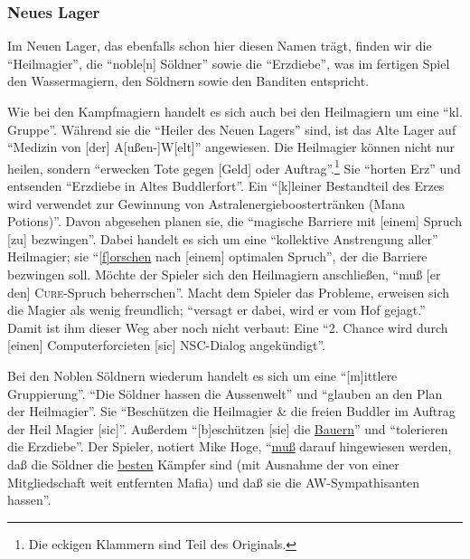 \documentclass[a5paper,pagesize,numbers=noenddot]{scrbook}
\begin{document}
\subsubsection{Neues Lager}\label{sec:orpheus_welt_fraktionen_neues}
Im Neuen Lager, das ebenfalls schon hier diesen Namen trägt, finden wir die \enquote{Heilmagier},\autocite[S.~7]{orpheus_gildensystem} die \enquote{noble[n] Söldner}\autocite[S.~8]{orpheus_gildensystem} sowie die \enquote{Erzdiebe},\autocite[S.~9]{orpheus_gildensystem} was im fertigen Spiel den Wassermagiern, den Söldnern sowie den Banditen entspricht.

Wie bei den Kampfmagiern handelt es sich auch bei den Heilmagiern um eine \enquote{kl. Gruppe}.
Während sie die \enquote{Heiler des Neuen Lagers} sind, ist das Alte Lager auf \enquote{Medizin von [der] A[ußen-]W[elt]} angewiesen.
Die Heilmagier können nicht nur heilen, sondern \enquote{erwecken Tote gegen [Geld] oder Auftrag}.\footnote{Die eckigen Klammern sind Teil des Originals.}
Sie \enquote{horten Erz} und entsenden \enquote{Erzdiebe in Altes Buddlerfort}.
Ein \enquote{[k]leiner Bestandteil des Erzes wird verwendet zur Gewinnung von Astralenergieboostertränken (Mana Potions)}.
Davon abgesehen planen sie, die \enquote{magische Barriere mit [einem] Spruch [zu] bezwingen}.
Dabei handelt es sich um eine \enquote{kollektive Anstrengung aller} Heilmagier; sie \enquote{\uline{[f]orschen} nach [einem] optimalen Spruch}, der die Barriere bezwingen soll.
Möchte der Spieler sich den Heilmagiern anschließen, \enquote{muß [er den] \textsc{Cure}-Spruch beherrschen}.
Macht dem Spieler das Probleme, erweisen sich die Magier als wenig freundlich; \enquote{versagt er dabei, wird er vom Hof gejagt.}
Damit ist ihm dieser Weg aber noch nicht verbaut:
Eine \enquote{2. Chance wird durch [einen] Computerforcieten [sic] NSC-Dialog angekündigt}.\autocite[S.~7]{orpheus_gildensystem}

Bei den Noblen Söldnern wiederum handelt es sich um eine \enquote{[m]ittlere Gruppierung}.
\enquote{Die Söldner hassen die Aussenwelt} und \enquote{glauben an den Plan der Heilmagier}.
Sie \enquote{Beschützen die Heilmagier \& die freien Buddler im Auftrag der Heil Magier [sic]}.
Außerdem \enquote{[b]eschützen [sie] die \uline{Bauern}} und \enquote{tolerieren die Erzdiebe}.
Der Spieler, notiert Mike Hoge, \enquote{\uline{muß} darauf hingewiesen werden, daß die Söldner die \uline{besten} Kämpfer sind (mit Ausnahme der von einer Mitgliedschaft weit entfernten Mafia) und daß sie die AW-Sympathisanten hassen}.\autocite[S.~8]{orpheus_gildensystem}
\end{document}
